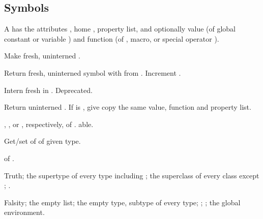 \subsection{Symbols}
A  has the attributes , home , property
list, and optionally value (of global constant or variable ) and
function (of , macro, or special operator ).

\begin{LIST}{1cm}

  {
  Make fresh, uninterned .
  }

  {
  Return fresh, uninterned symbol  with  from
  . Increment . 
  }

  {
  Intern fresh  in . Deprecated.
  }

  {
  Return uninterned . If  is
  \T, give copy the same value, function and property list.
  }

  {
  , , or , respectively,
  of . able. 
  }

  {
  Get/set  of  of given
  type.
  }

  {
   of .
  }

  {
  Truth; the supertype of every type including ; the superclass of every
  class except ; .
  }

  {
  Falsity; the empty list; the empty type, subtype of every type; ;
  ; the global environment.
  }

\end{LIST}


